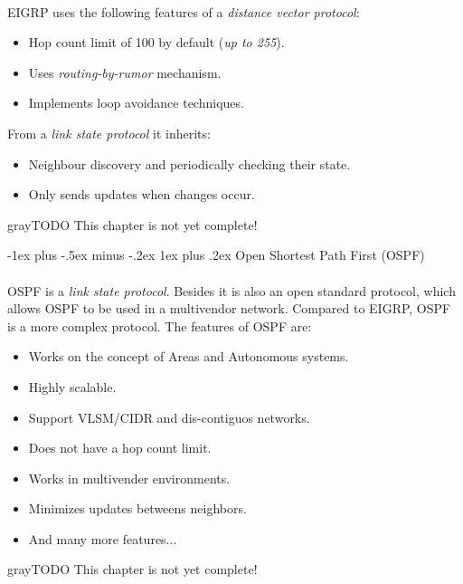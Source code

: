 \documentclass[10pt,landscape]{article}
\makeatletter
\renewcommand{\subsubsection}{\@startsection{subsubsection}{3}{0mm}%
                                {-1ex plus -.5ex minus -.2ex}%
                                {1ex plus .2ex}%
                                {\normalfont\small\bfseries}}
\makeatother
\begin{document}
\begin{multicols}{3}
\paragraph{}
EIGRP uses the following features of a \textit{distance vector protocol}:
\begin{itemize}
	\item Hop count limit of 100 by default (\textit{up to 255}).
	\item Uses \textit{routing-by-rumor} mechanism.
	\item Implements loop avoidance techniques.
\end{itemize}
From a \textit{link state protocol} it inherits:
\begin{itemize}
	\item Neighbour discovery and periodically checking their state.
	\item Only sends updates when changes occur.
\end{itemize}
\begin{textbox}{gray}{TODO}
	This chapter is not yet complete!
\end{textbox}

\subsubsection{Open Shortest Path First (OSPF)}
\paragraph{}
OSPF is a \textit{link state protocol}. Besides it is also an open standard protocol, which allows OSPF to be used in a multivendor network.
Compared to EIGRP, OSPF is a more complex protocol. The features of OSPF are:
\begin{itemize}
	\item Works on the concept of Areas and Autonomous systems.
	\item Highly scalable.
	\item Support VLSM/CIDR and dis-contiguos networks.
	\item Does not have a hop count limit.
	\item Works in multivender environments.
	\item Minimizes updates betweens neighbors.
	\item And many more features...
\end{itemize}
\begin{textbox}{gray}{TODO}
	This chapter is not yet complete!
\end{textbox}


\end{multicols}
\end{document}
